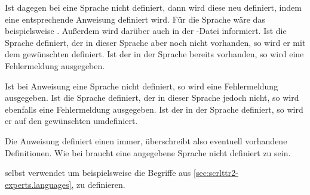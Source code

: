 Ist dagegen bei 
eine Sprache nicht definiert, dann wird diese neu definiert, indem eine
entsprechende Anweisung definiert wird. Für die Sprache
 wäre das beispielsweise . Außerdem
wird darüber auch in der -Datei informiert. Ist die Sprache
definiert, der  in dieser Sprache aber noch nicht
vorhanden, so wird er mit dem gewünschten  definiert. Ist der
 in der Sprache bereits vorhanden, so wird eine
Fehlermeldung ausgegeben.

Ist bei Anweisung  eine Sprache nicht definiert, so
wird eine Fehlermeldung ausgegeben. Ist die Sprache definiert, der
 in dieser Sprache jedoch nicht, so wird ebenfalls eine
Fehlermeldung ausgegeben. Ist der  in der Sprache definiert, so
wird er auf den gewünschten  umdefiniert.

Die Anweisung 
definiert einen  immer, überschreibt also eventuell vorhandene
Definitionen. Wie bei  braucht eine angegebene
Sprache nicht definiert zu sein.

\KOMAScript{} selbst verwendet  um beispielsweise
die Begriffe aus \autoref{sec:scrlttr2-experts.languages},
 zu definieren.

